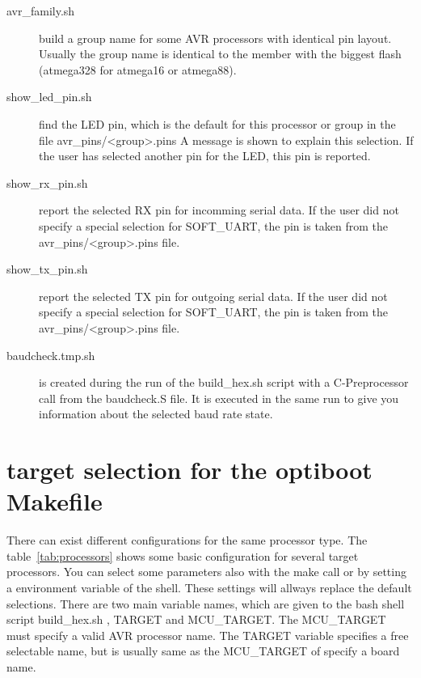 \begin{description}
\item [avr\_family.sh] build a group name for some AVR processors with identical pin layout.
Usually the group name is identical to the member with the biggest flash
(atmega328 for atmega16 or atmega88).

\item [show\_led\_pin.sh] find the LED pin, which is the default for this processor or group
in the file avr\_pins/<group>.pins
A message is shown to explain this selection. If the user has selected another pin for the
LED, this pin is reported.

\item [show\_rx\_pin.sh] report the selected RX pin for incomming serial data.
If the user did not specify a special selection for SOFT\_UART, the pin is taken from
the avr\_pins/<group>.pins file.

\item [show\_tx\_pin.sh] report the selected TX pin for outgoing serial data.
If the user did not specify a special selection for SOFT\_UART, the pin is taken from
the avr\_pins/<group>.pins file.

\item [baudcheck.tmp.sh] is created during the run of the build\_hex.sh script
with a C-Preprocessor call from the baudcheck.S file.
It is executed in the same run to give you information about the selected
baud rate state.

\end{description}

\section{target selection for the optiboot Makefile}

There can exist different configurations for the same processor type.
The table~\ref{tab:processors} shows some basic configuration
for several target processors.
You can select some parameters also with the make call or by setting
a environment variable of the shell.
These settings will allways replace the default selections.
There are two main variable names, which are given to the bash shell script
build\_hex.sh , TARGET and MCU\_TARGET. The MCU\_TARGET must specify a valid
AVR processor name. The TARGET variable specifies a free selectable name,
but is usually same as the MCU\_TARGET of specify a board name.

